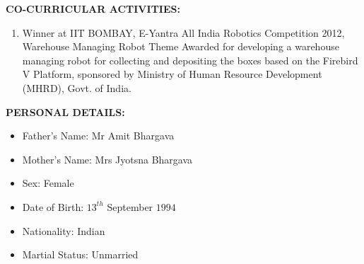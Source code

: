 \documentclass{article}
\begin{document}
\textbf{CO-CURRICULAR ACTIVITIES:}
\begin{enumerate}
	\item Winner at IIT BOMBAY, E-Yantra All India Robotics Competition 2012, Warehouse Managing Robot Theme
	Awarded for developing a warehouse managing robot for collecting and depositing the boxes based on the Firebird V Platform, sponsored by Ministry of Human Resource Development (MHRD), Govt. of India.
\end{enumerate}

\textbf{PERSONAL DETAILS:}
\begin{itemize}
	\item Father's Name: Mr Amit Bhargava
	\item Mother's Name: Mrs Jyotsna Bhargava
	\item Sex: Female
	\item Date of Birth: $13^{th}$ September $1994$
	\item Nationality: Indian
	\item Martial Status: Unmarried
\end{itemize}
\end{document}
